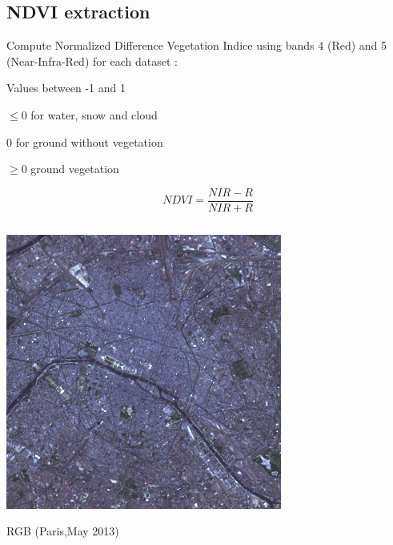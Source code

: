 \documentclass[c]{beamer}
\begin{document}
\subsection{NDVI extraction}
\begin{frame}
\begin{itemize}
{
 \item Compute Normalized Difference Vegetation Indice using bands 4 (Red) and 5 (Near-Infra-Red) for each dataset :
 \item Values between -1 and 1
 \item $\leq 0$ for water, snow and cloud
 \item $0$ for  ground without vegetation
 \item $\geq 0$ ground vegetation
}
\end{itemize}
{\scriptsize \[NDVI=\frac{NIR-R}{NIR+R}\]}
\begin{columns}
 \begin{column}{0.33\textwidth}
  \begin{overlayarea}{\linewidth}{2cm}
  \centering\vfill
  \includegraphics[scale=0.15]{images/Paris/05_rgb.png}
  \end{overlayarea}
  \begin{overlayarea}{\linewidth}{0.5cm}
  \centering
  \tiny RGB (Paris,May 2013) \par
  \end{overlayarea}
 \end{column}
  \begin{column}{0.33\textwidth}
  \begin{overlayarea}{\linewidth}{2cm}
  \centering\vfill
  \centerline{
}
\end{overlayarea}
\end{column}
\end{columns}
\end{frame}
\end{document}
